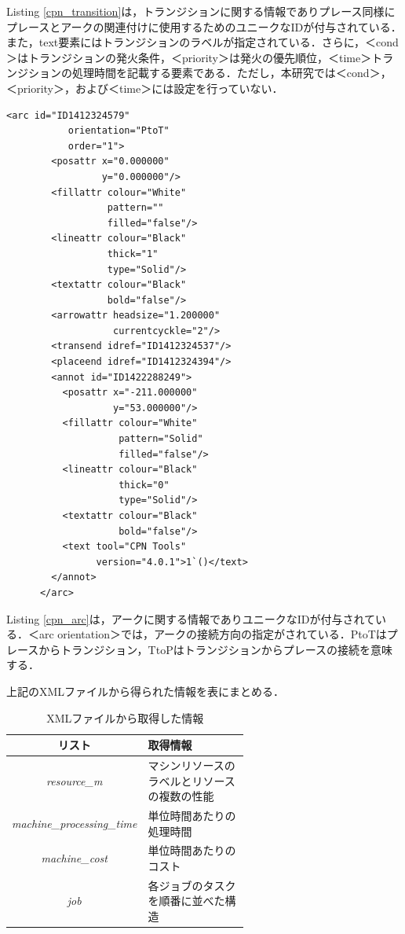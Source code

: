 Listing \ref{cpn_transition}は，トランジションに関する情報でありプレース同様にプレースとアークの関連付けに使用するためのユニークなIDが付与されている．また，text要素にはトランジションのラベルが指定されている．さらに，＜cond＞はトランジションの発火条件，＜priority＞は発火の優先順位，＜time＞トランジションの処理時間を記載する要素である．ただし，本研究では＜cond＞，＜priority＞，および＜time＞には設定を行っていない．

\begin{lstlisting}[caption=アークのXMLファイル,label=cpn_arc]
<arc id="ID1412324579"
           orientation="PtoT"
           order="1">
        <posattr x="0.000000"
                 y="0.000000"/>
        <fillattr colour="White"
                  pattern=""
                  filled="false"/>
        <lineattr colour="Black"
                  thick="1"
                  type="Solid"/>
        <textattr colour="Black"
                  bold="false"/>
        <arrowattr headsize="1.200000"
                   currentcyckle="2"/>
        <transend idref="ID1412324537"/>
        <placeend idref="ID1412324394"/>
        <annot id="ID1422288249">
          <posattr x="-211.000000"
                   y="53.000000"/>
          <fillattr colour="White"
                    pattern="Solid"
                    filled="false"/>
          <lineattr colour="Black"
                    thick="0"
                    type="Solid"/>
          <textattr colour="Black"
                    bold="false"/>
          <text tool="CPN Tools"
                version="4.0.1">1`()</text>
        </annot>
      </arc>
\end{lstlisting}

Listing \ref{cpn_arc}は，アークに関する情報でありユニークなIDが付与されている．＜arc orientation＞では，アークの接続方向の指定がされている．PtoTはプレースからトランジション，TtoPはトランジションからプレースの接続を意味する．

上記のXMLファイルから得られた情報を表にまとめる．

\begin{table}[ht]
    \centering
    \caption{XMLファイルから取得した情報}
    \begin{tabular}{|c|p{0.6\linewidth}|} %
        \hline
        \textbf{リスト} & \textbf{取得情報} \\
        \hline
        \textit{resource\_m} & マシンリソースのラベルとリソースの複数の性能 \\
        \textit{machine\_processing\_time} & 単位時間あたりの処理時間 \\
        \textit{machine\_cost} & 単位時間あたりのコスト \\
        \textit{job} & 各ジョブのタスクを順番に並べた構造 \\
        \hline
    \end{tabular}
    \label{variable}
\end{table}


